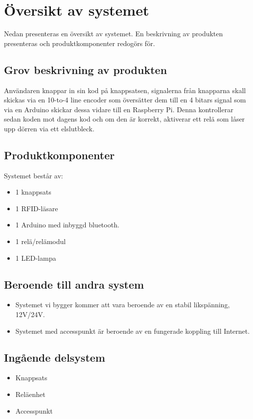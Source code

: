 \documentclass[twocolumn]{article}
\begin{document}
\clearpage
\section{Översikt av systemet}
Nedan presenteras en översikt av systemet. En beskrivning av produkten presenteras och produktkomponenter redogörs för.

\subsection{Grov beskrivning av produkten}
Användaren knappar in sin kod på knappsatsen, signalerna från knapparna skall skickas via en 10-to-4 line encoder som översätter dem till en 4 bitars signal som via en Arduino skickar dessa vidare till en Raspberry Pi. Denna kontrollerar sedan koden mot dagens kod och om den är korrekt, aktiverar ett relä som låser upp dörren via ett elslutbleck.

\subsection{Produktkomponenter}
Systemet består av:
\begin{itemize}
    \item 1 knappsats
    \item 1 RFID-läsare
    \item 1 Arduino med inbyggd bluetooth.
    \item 1 relä/relämodul
    \item 1 LED-lampa
\end{itemize}

\subsection{Beroende till andra system}
\begin{itemize}
    \item Systemet vi bygger kommer att vara beroende av en stabil likspänning, 12V/24V.
    \item Systemet med accesspunkt är beroende av en fungerade koppling till Internet.
\end{itemize}

\subsection{Ingående delsystem}
\begin{itemize}
    \item Knappsats
    \item Reläenhet
    \item Accesspunkt
\end{itemize}
\end{document}
